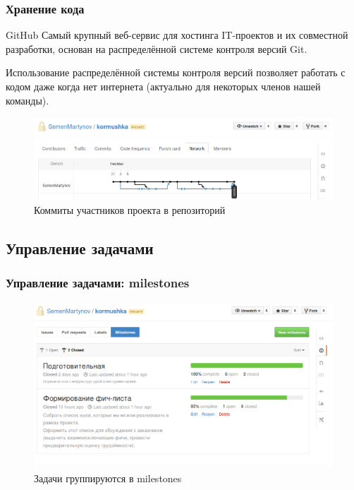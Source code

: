 \documentclass{beamer}
\begin{document}
\begin{frame}
\frametitle{Хранение кода}

\begin{block}{GitHub}
Самый крупный веб-сервис для хостинга IT-проектов и их совместной разработки, основан на распределённой системе контроля версий Git.
\end{block}

Использование распределённой системы контроля версий позволяет работать с кодом даже когда нет интернета (актуально для некоторых членов нашей команды).

\begin{figure}
\includegraphics[scale=0.30]{res/r1_git}
\caption{Коммиты участников проекта в репозиторий}
\end{figure}

\end{frame}


\subsection{Управление задачами}

\begin{frame}
\frametitle{Управление задачами: milestones}

\begin{figure}
\includegraphics[scale=0.30]{res/r1_milestones}
\caption{Задачи группируются в milestones}
\end{figure}

\end{frame}
\end{document}
